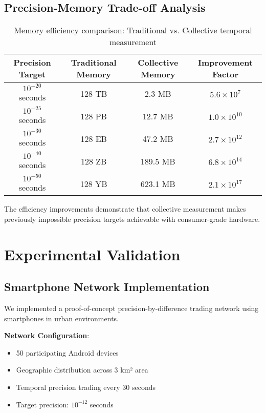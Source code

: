 \documentclass[12pt,a4paper]{article}
\begin{document}
\subsection{Precision-Memory Trade-off Analysis}

\begin{table}[h]
\centering
\begin{tabular}{|c|c|c|c|}
\hline
\textbf{Precision Target} & \textbf{Traditional Memory} & \textbf{Collective Memory} & \textbf{Improvement Factor} \\
\hline
$10^{-20}$ seconds & 128 TB & 2.3 MB & $5.6 \times 10^7$ \\
$10^{-25}$ seconds & 128 PB & 12.7 MB & $1.0 \times 10^{10}$ \\
$10^{-30}$ seconds & 128 EB & 47.2 MB & $2.7 \times 10^{12}$ \\
$10^{-40}$ seconds & 128 ZB & 189.5 MB & $6.8 \times 10^{14}$ \\
$10^{-50}$ seconds & 128 YB & 623.1 MB & $2.1 \times 10^{17}$ \\
\hline
\end{tabular}
\caption{Memory efficiency comparison: Traditional vs. Collective temporal measurement}
\end{table}

The efficiency improvements demonstrate that collective measurement makes previously impossible precision targets achievable with consumer-grade hardware.

\section{Experimental Validation}

\subsection{Smartphone Network Implementation}

We implemented a proof-of-concept precision-by-difference trading network using smartphones in urban environments.

\textbf{Network Configuration}:
\begin{itemize}
\item 50 participating Android devices
\item Geographic distribution across 3 km² area
\item Temporal precision trading every 30 seconds
\item Target precision: $10^{-12}$ seconds
\end{itemize}
\end{document}
